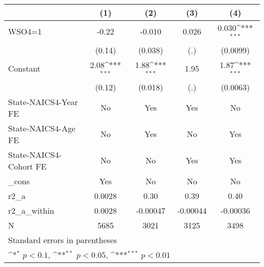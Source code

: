 {
\def\sym#1{\ifmmode^{#1}\else\(^{#1}\)\fi}
\begin{tabular}{l*{4}{c}}
\hline\hline
                    &\multicolumn{1}{c}{(1)}         &\multicolumn{1}{c}{(2)}         &\multicolumn{1}{c}{(3)}         &\multicolumn{1}{c}{(4)}         \\
\hline
WSO4=1              &       -0.22         &      -0.010         &       0.026         &       0.030\sym{***}\\
                    &      (0.14)         &     (0.038)         &         (.)         &    (0.0099)         \\
[1em]
Constant            &        2.08\sym{***}&        1.88\sym{***}&        1.95         &        1.87\sym{***}\\
                    &      (0.12)         &     (0.018)         &         (.)         &    (0.0063)         \\
[1em]
State-NAICS4-Year FE&          No         &         Yes         &         Yes         &          No         \\
[1em]
State-NAICS4-Age FE &          No         &         Yes         &          No         &         Yes         \\
[1em]
State-NAICS4-Cohort FE&          No         &          No         &         Yes         &         Yes         \\
[1em]
\_cons              &         Yes         &          No         &          No         &          No         \\
\hline
r2\_a                &      0.0028         &        0.30         &        0.39         &        0.40         \\
r2\_a\_within         &      0.0028         &    -0.00047         &    -0.00044         &    -0.00036         \\
N                   &        5685         &        3021         &        3125         &        3498         \\
\hline\hline
\multicolumn{5}{l}{\footnotesize Standard errors in parentheses}\\
\multicolumn{5}{l}{\footnotesize \sym{*} \(p<0.1\), \sym{**} \(p<0.05\), \sym{***} \(p<0.01\)}\\
\end{tabular}
}

